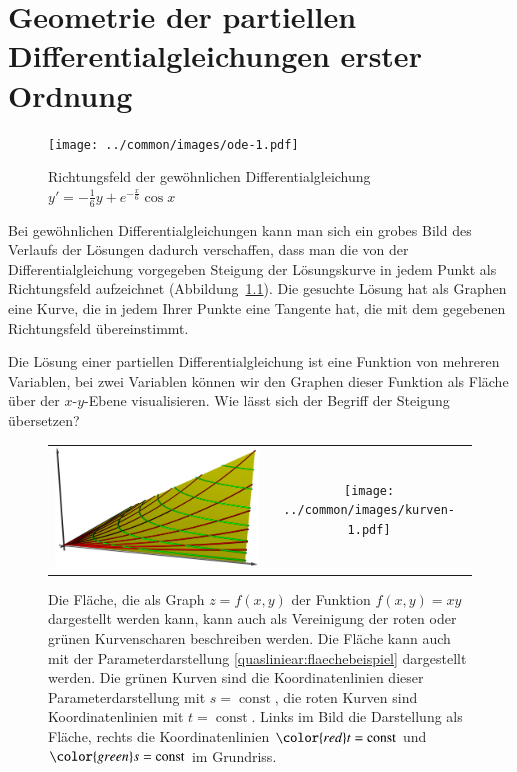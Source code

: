 %
%
%
\chapter{Geometrie der partiellen Differentialgleichungen erster Ordnung\label{chapter-geometrie}}
\begin{figure}
\begin{center}
\texttt{[image: ../common/images/ode-1.pdf]}
\end{center}
\caption{Richtungsfeld der gewöhnlichen Differentialgleichung
$y'=-\frac16y+e^{-\frac{x}6}\cos x$ \label{geometrie:ode}}
\end{figure}
Bei gewöhnlichen Differentialgleichungen kann man sich ein grobes
Bild des Verlaufs der Lösungen dadurch verschaffen, dass man
die von der Differentialgleichung vorgegeben Steigung der Lösungskurve
in jedem Punkt als Richtungsfeld aufzeichnet (Abbildung~\ref{geometrie:ode}).
Die gesuchte Lösung hat als Graphen eine Kurve, die in jedem Ihrer Punkte eine
Tangente hat, die mit dem gegebenen Richtungsfeld übereinstimmt.

Die Lösung einer
partiellen Differentialgleichung ist eine Funktion von mehreren Variablen,
bei zwei Variablen können wir den Graphen dieser Funktion als Fläche
über der $x$-$y$-Ebene visualisieren. Wie lässt sich der Begriff der
Steigung übersetzen?

\begin{figure}
\centering
\begin{tabular}{cc}
\includegraphics[width=0.6\hsize]{../common/3d/surface.jpg}&%
\texttt{[image: ../common/images/kurven-1.pdf]}
\end{tabular}
\caption{Die Fläche, die als Graph $z=f(x,y)$ der Funktion $f(x,y)=xy$ 
dargestellt werden kann, kann auch als Vereinigung der roten oder grünen
Kurvenscharen beschreiben werden.
Die Fläche kann auch mit der Parameterdarstellung
\eqref{quasliniear:flaechebeispiel}
dargestellt werden.
Die grünen Kurven sind die Koordinatenlinien dieser Parameterdarstellung
mit $s=\operatorname{const}$,
die roten Kurven sind Koordinatenlinien mit $t=\operatorname{const}$.
Links im Bild die Darstellung als Fläche, rechts die Koordinatenlinien
${\color{red}t}=\operatorname{const}$
und
${\color{green}s}=\operatorname{const}$
im Grundriss.
\label{quasilinear:flaechenalskurven}
}
\end{figure}

